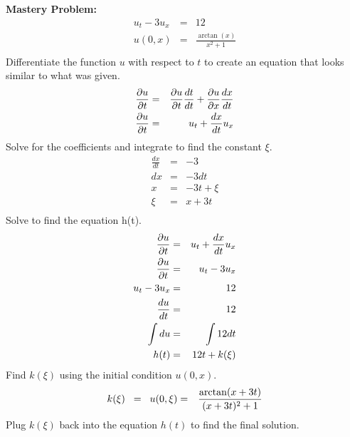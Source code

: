 \documentclass{article}
\newcommand{\bea}{\begin{eqnarray*}}
\newcommand{\eea}{\end{eqnarray*}}
\newcommand{\pp}[2]{{\partial #1 \over \partial #2}}
\begin{document}
\vspace{1cm}
\textbf{Mastery Problem:}
\bea
u_t-3u_x &=& 12\\
u(0,x) &=& \frac{\arctan(x)}{x^2+1}\\
\eea
Differentiate the function $u$ with respect to $t$ to create an equation that looks similar to what was given.
\bea
\pp{u}{t} &=& \pp{u}{t}\frac{dt}{dt} + \pp{u}{x}\frac{dx}{dt}\\
\pp{u}{t} &=& u_t + \frac{dx}{dt}u_x\\
\eea
Solve for the coefficients and integrate to find the constant $\xi$.
\bea
\frac{dx}{dt} &=& -3\\
dx &=& -3dt\\
x &=& -3t + \xi\\
\xi &=& x+3t\\
\eea
Solve to find the equation h(t).
\bea
\pp{u}{t} &=& u_t + \frac{dx}{dt}u_x\\
\pp{u}{t} &=& u_t -3u_x\\
u_t -3u_x &=& 12\\
\frac{du}{dt} &=& 12\\
\int du &=& \int{12}dt\\
h(t) &=& 12t+k(\xi)\\
\eea
Find $k(\xi)$ using the initial condition $u(0,x)$.
\bea
k(\xi) \hspace{2mm} = \hspace{2mm} u(0,\xi) &=& \frac{\arctan(x+3t)}{(x+3t)^2+1}\\
\eea
Plug $k(\xi)$ back into the equation $h(t)$ to find the final solution.
\begin{center}
\end{center}
\end{document}
